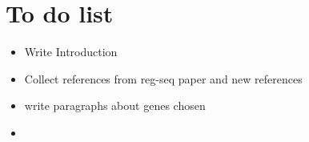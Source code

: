 \section{To do list}
\begin{itemize}
    \item Write Introduction
    \item Collect references from reg-seq paper and new references
    \item write paragraphs about genes chosen
    \item 
\end{itemize}
